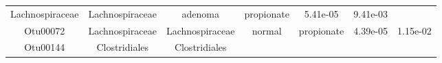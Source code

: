 \documentclass[11pt,]{article}
\begin{document}
\begin{longtable}[]{@{}ccccccc@{}}
\begin{minipage}[t]{0.17\columnwidth}
Lachnospiraceae\strut
\end{minipage} & \begin{minipage}[t]{0.17\columnwidth}\centering\strut
Lachnospiraceae\strut
\end{minipage} & \begin{minipage}[t]{0.09\columnwidth}\centering\strut
adenoma\strut
\end{minipage} & \begin{minipage}[t]{0.11\columnwidth}\centering\strut
propionate\strut
\end{minipage} & \begin{minipage}[t]{0.09\columnwidth}\centering\strut
5.41e-05\strut
\end{minipage} & \begin{minipage}[t]{0.09\columnwidth}\centering\strut
9.41e-03\strut
\end{minipage}\tabularnewline
\begin{minipage}[t]{0.09\columnwidth}\centering\strut
Otu00072\strut
\end{minipage} & \begin{minipage}[t]{0.17\columnwidth}\centering\strut
Lachnospiraceae\strut
\end{minipage} & \begin{minipage}[t]{0.17\columnwidth}\centering\strut
Lachnospiraceae\strut
\end{minipage} & \begin{minipage}[t]{0.09\columnwidth}\centering\strut
normal\strut
\end{minipage} & \begin{minipage}[t]{0.11\columnwidth}\centering\strut
propionate\strut
\end{minipage} & \begin{minipage}[t]{0.09\columnwidth}\centering\strut
4.39e-05\strut
\end{minipage} & \begin{minipage}[t]{0.09\columnwidth}\centering\strut
1.15e-02\strut
\end{minipage}\tabularnewline
\begin{minipage}[t]{0.09\columnwidth}\centering\strut
Otu00144\strut
\end{minipage} & \begin{minipage}[t]{0.17\columnwidth}\centering\strut
Clostridiales\strut
\end{minipage} & \begin{minipage}[t]{0.17\columnwidth}\centering\strut
Clostridiales\strut
\end{minipage} & \begin{minipage}[t]{0.09\columnwidth}\centering\strut

\end{minipage}
\end{longtable}
\end{document}
